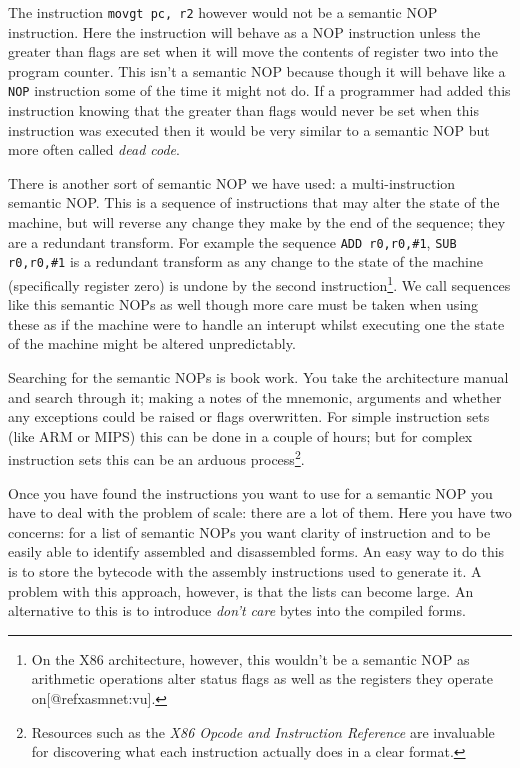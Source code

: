\documentclass[]{book}
\begin{document}
The instruction \lstinline!movgt pc, r2! however would not be a semantic
NOP instruction. Here the instruction will behave as a NOP instruction
unless the greater than flags are set when it will move the contents of
register two into the program counter. This isn't a semantic NOP because
though it will behave like a \lstinline!NOP! instruction some of the
time it might not do. If a programmer had added this instruction knowing
that the greater than flags would never be set when this instruction was
executed then it would be very similar to a semantic NOP but more often
called \emph{dead code}\autocite{Collberg:1997vt}.

There is another sort of semantic NOP we have used: a multi-instruction
semantic NOP. This is a sequence of instructions that may alter the
state of the machine, but will reverse any change they make by the end
of the sequence; they are a redundant transform. For example the
sequence \lstinline!ADD r0,r0,#1!, \lstinline!SUB r0,r0,#1! is a
redundant transform as any change to the state of the machine
(specifically register zero) is undone by the second
instruction\footnote{On the X86
  architecture\autocite{IntelCorporation:1997ta}, however, this wouldn't
  be a semantic NOP as arithmetic operations alter status flags as well
  as the registers they operate on{[}@refxasmnet:vu{]}.}. We call
sequences like this semantic NOPs as well though more care must be taken
when using these as if the machine were to handle an interupt whilst
executing one the state of the machine might be altered unpredictably.

Searching for the semantic NOPs is book work. You take the architecture
manual and search through it; making a notes of the mnemonic, arguments
and whether any exceptions could be raised or flags overwritten. For
simple instruction sets (like ARM or MIPS) this can be done in a couple
of hours; but for complex instruction sets this can be an arduous
process\footnote{Resources such as the \emph{X86 Opcode and Instruction
  Reference} \autocite{refx86} are invaluable for discovering what each
  instruction actually does in a clear format.}.

Once you have found the instructions you want to use for a semantic NOP
you have to deal with the problem of scale: there are a lot of them.
Here you have two concerns: for a list of semantic NOPs you want clarity
of instruction and to be easily able to identify assembled and
disassembled forms. An easy way to do this is to store the bytecode with
the assembly instructions used to generate it. A problem with this
approach, however, is that the lists can become large. An alternative to
this is to introduce \emph{don't care} bytes into the compiled forms.
\end{document}
